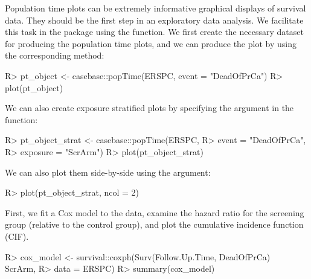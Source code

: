 \documentclass[
]{jss}
\begin{document}
Population time plots can be extremely informative graphical displays of
survival data. They should be the first step in an exploratory data
analysis. We facilitate this task in the  package using
the  function. We first create the necessary dataset for
producing the population time plots, and we can produce the plot by
using the corresponding  method:

\begin{CodeChunk}

\begin{CodeInput}
R> pt_object <- casebase::popTime(ERSPC, event = "DeadOfPrCa")
R> plot(pt_object)
\end{CodeInput}
\end{CodeChunk}

We can also create exposure stratified plots by specifying the
 argument in the  function:

\begin{CodeChunk}

\begin{CodeInput}
R> pt_object_strat <- casebase::popTime(ERSPC, 
R>                                      event = "DeadOfPrCa", 
R>                                      exposure = "ScrArm")
R> plot(pt_object_strat)
\end{CodeInput}
\end{CodeChunk}

We can also plot them side-by-side using the  argument:

\begin{CodeChunk}

\begin{CodeInput}
R> plot(pt_object_strat, ncol = 2)
\end{CodeInput}
\end{CodeChunk}

First, we fit a Cox model to the data, examine the hazard ratio for the
screening group (relative to the control group), and plot the cumulative
incidence function (CIF).

\begin{CodeChunk}

\begin{CodeInput}
R> cox_model <- survival::coxph(Surv(Follow.Up.Time, DeadOfPrCa) ~ ScrArm, 
R>                              data = ERSPC)
R> summary(cox_model)
\end{CodeInput}
\end{CodeChunk}
\end{document}
